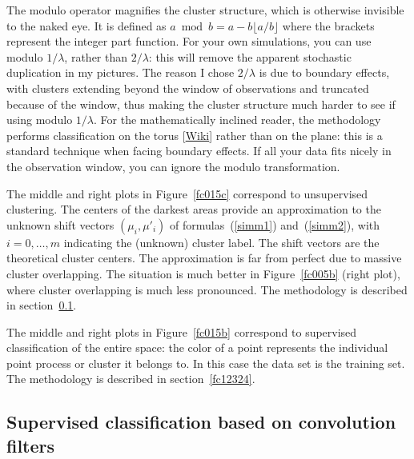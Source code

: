 \documentclass[oneside,10pt]{book}
\begin{document}
The modulo operator  magnifies the cluster structure, which is otherwise invisible to the naked eye.  It is defined as
$a \bmod b = a -  b \lfloor a/b \rfloor$ where the brackets represent the integer part function. For your own simulations, you can use modulo $1/\lambda$,
rather than $2/\lambda$: this will remove the apparent stochastic duplication in my pictures. The reason I chose $2/\lambda$ is due to boundary effects, with clusters extending beyond
the window of observations and truncated because of the window, thus making the cluster structure much harder to see if using modulo $1/\lambda$.  For the mathematically inclined reader, the methodology performs
\textcolor{index}{classification on the torus} [\href{https://en.wikipedia.org/wiki/Periodic_boundary_conditions}{Wiki}] rather than on the plane: this is a standard technique when facing boundary effects. If all your data fits nicely in the observation window, you can ignore the modulo transformation.

The middle and right plots in Figure~\ref{fc015c} correspond to \textcolor{index}{unsupervised clustering}. The centers of the darkest areas provide an approximation to the unknown shift vectors
$(\mu_i,\mu'_i)$ of formulas~(\ref{simm1}) and~(\ref{simm2}), with $i=0,\dots,m$ indicating the (unknown) cluster label. The shift vectors are the theoretical cluster centers. The approximation is far from perfect due to massive cluster overlapping.
The situation is much better in Figure~\ref{fc005b} (right plot), where cluster overlapping is much less pronounced. The methodology is described in section~\ref{fc12323}.

The middle and right plots in Figure~\ref{fc015b}  correspond to \textcolor{index}{supervised classification} of the entire space:  the color of a point represents the individual point process or cluster it belongs to. In this case the data set is the training set. The methodology is described in section~\ref{fc12324}.


\subsection{Supervised classification based on convolution filters}\label{fc12323}
\end{document}
